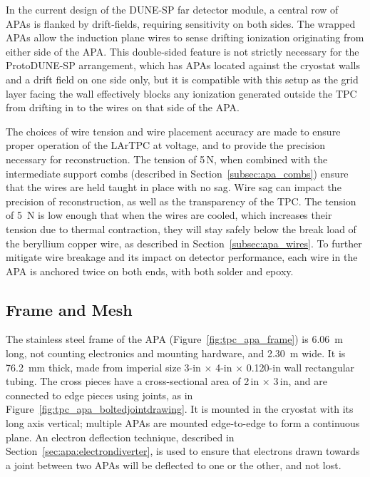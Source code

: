 In the current design of the DUNE-SP far detector module, a central row of APAs is flanked by  drift-fields, requiring sensitivity on both sides. The wrapped APAs allow the induction plane wires to sense drifting ionization originating from either side of the APA.  This double-sided feature is not strictly necessary for the ProtoDUNE-SP arrangement, which has APAs located against the cryostat walls and a drift field on one side only, but it is compatible with this setup as the grid layer facing the wall effectively blocks any ionization generated outside the TPC from drifting in to the wires on that side of the APA.

The choices of wire tension and wire placement accuracy are made to ensure proper operation of the LArTPC at voltage, and to provide the precision necessary for reconstruction.  The tension of 5\,N, when combined with the intermediate support combs (described in Section~\ref{subsec:apa_combs}) ensure that the wires are held taught in place with no sag.  Wire sag can impact the precision of reconstruction, as well as the transparency of the TPC.  The tension of 5~N is low enough that when the wires are cooled, which increases their tension due to thermal contraction, they will stay safely below the break load of the beryllium copper wire, as described in Section~\ref{subsec:apa_wires}.  To further mitigate wire breakage and its impact on detector performance, each wire in the APA is anchored twice on both ends, with both solder and epoxy.  

\subsection{Frame and Mesh}
\label{sec:fdsp-apa-frames}


The stainless steel frame of the APA (Figure~\ref{fig:tpc_apa_frame}) is 6.06~m long, not counting electronics and mounting hardware, and 2.30~m wide.  It is 76.2~mm thick, made from imperial size 3-in $\times$ 4-in $\times$ 0.120-in wall rectangular tubing.  The cross pieces have a cross-sectional area of 2\,in $\times$ 3\,in, and are connected to edge pieces using joints, as in Figure~\ref{fig:tpc_apa_boltedjointdrawing}.  It is mounted in the cryostat with its long axis vertical; multiple APAs are mounted edge-to-edge to form a continuous plane. An electron deflection technique, described in Section~\ref{sec:apa:electrondiverter}, is used to ensure that electrons drawn towards a joint between two APAs will be deflected to one or the other, and not lost.

